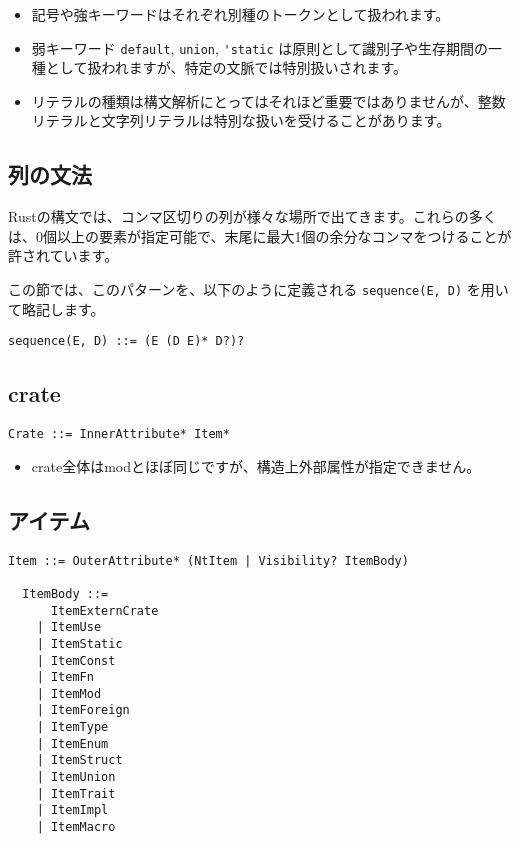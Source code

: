 \documentclass[dvipdfmx,uplatex,papersize,a4paper,10pt]{jsbook}
\theoremstyle{definition}
\begin{document}
\begin{itemize}
  \item 記号や強キーワードはそれぞれ別種のトークンとして扱われます。
  \item 弱キーワード \verb|default|, \verb|union|, \verb|'static| は原則として識別子や生存期間の一種として扱われますが、特定の文脈では特別扱いされます。
  \item リテラルの種類は構文解析にとってはそれほど重要ではありませんが、整数リテラルと文字列リテラルは特別な扱いを受けることがあります。
\end{itemize}

\subsection{列の文法}

Rustの構文では、コンマ区切りの列が様々な場所で出てきます。これらの多くは、0個以上の要素が指定可能で、末尾に最大1個の余分なコンマをつけることが許されています。

この節では、このパターンを、以下のように定義される \verb|sequence(E, D)| を用いて略記します。

\begin{lstlisting}[language=BNFLike, gobble=2]
  sequence(E, D) ::= (E (D E)* D?)?
\end{lstlisting}

\subsection{crate}

\begin{lstlisting}[language=BNFLike, gobble=2]
  Crate ::= InnerAttribute* Item*
\end{lstlisting}

\begin{itemize}
  \item crate全体はmodとほぼ同じですが、構造上外部属性が指定できません。
\end{itemize}

\subsection{アイテム}

\begin{lstlisting}[language=BNFLike, gobble=2]
  Item ::= OuterAttribute* (NtItem | Visibility? ItemBody)

  ItemBody ::=
      ItemExternCrate
    | ItemUse
    | ItemStatic
    | ItemConst
    | ItemFn
    | ItemMod
    | ItemForeign
    | ItemType
    | ItemEnum
    | ItemStruct
    | ItemUnion
    | ItemTrait
    | ItemImpl
    | ItemMacro
\end{lstlisting}
\end{document}
